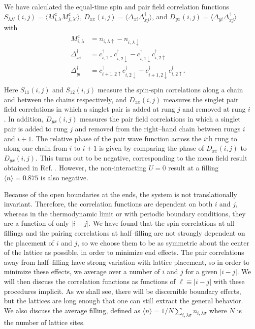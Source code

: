 We have calculated the equal-time spin and pair field correlation
functions
$S_{\lambda\lambda '}(i,j)=\langle M^z_{i,\lambda} M^z_{j,\lambda '}\rangle$,
$D_{xx}(i,j)= \langle \Delta_{x i} \Delta^\dagger_{x j} \rangle$,
and
$D_{yx}(i,j) = \langle \Delta_{y i} \Delta^\dagger_{x j} \rangle$
with
\begin{eqnarray}
\begin{array}{cl}
M^z_{i,\lambda} & = n_{i,\lambda \uparrow} - n_{i,\lambda \downarrow}\\
\Delta^\dagger_{x i} & = c^\dagger_{i,1 \uparrow} c^\dagger_{i,2 \downarrow}
- c^\dagger_{i,1 \downarrow} c^\dagger_{i,2 \uparrow}  \\
\Delta^\dagger_{y i} & =
 c^\dagger_{i+1,2 \uparrow} c^\dagger_{i,2 \downarrow}
- c^\dagger_{i+1,2 \downarrow} c^\dagger_{i,2 \uparrow}. \\
\end{array}
\end{eqnarray}
Here $S_{11}(i,j)$ and $S_{12}(i,j)$ measure the spin-spin
correlations along a chain and between the chains respectively,  and
$D_{xx}(i,j)$ measures the singlet pair field correlations in which a
singlet pair is added at rung $j$ and removed at rung $i$.
In addition, $D_{yx} (i,j)$ measures the pair field correlations in
which a singlet pair is added to rung $j$ and removed from the
right--hand chain between rungs $i$ and $i+1$.
The relative phase of the pair wave function across the $i$th rung to
along one chain from $i$ to $i+1$ is given by comparing the phase of
$D_{xx}(i,j)$ to $D_{yx}(i,j)$.
This turns out to be negative, corresponding to the mean field result
obtained in Ref. \cite{rice2}.
However, the non-interacting $U=0$ result at a filling
$\langle n \rangle = 0.875$ is also negative.

Because of the open boundaries at the ends,
the system is not translationally invariant.
Therefore, the correlation
functions are dependent on both $i$ and $j$, whereas in the
thermodynamic limit or with periodic boundary conditions, they are a
function of only $| i-j |$.
We have found that the spin correlations at all fillings and the
pairing correlations at half--filling are not strongly dependent on
the placement of $i$ and $j$, so we choose them to be as symmetric
about the center of the lattice as possible, in order to minimize end
effects.
The pair correlations away from half--filling have strong variation
with lattice placement, so in order to minimize these effects, we
average over a number of $i$ and $j$ for a given $|i-j|$.
We will then discuss the
correlation functions as functions of $\ell \equiv | i-j |$ with these
procedures implicit.
As we shall see, there will be discernible boundary effects, but the
lattices are long enough that one can still extract the general
behavior.
We also discuss the average filling, defined as
$\langle n \rangle = 1/N\sum_{i,\lambda \sigma} n_{i,\lambda \sigma}$
where $N$ is the number of lattice sites.

